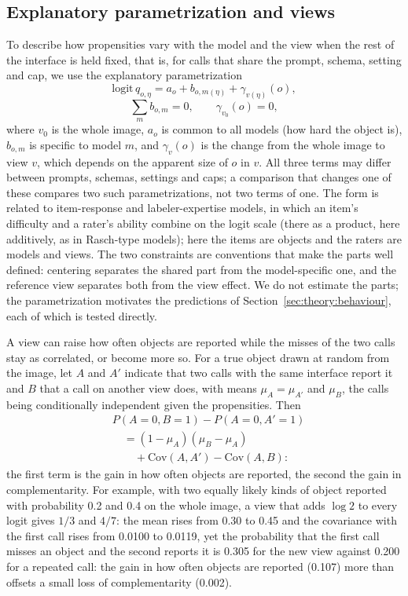 \subsection{Explanatory parametrization and views}\label{app:param}

To describe how propensities vary with the model and the view when the rest of the interface is held fixed, that is, for calls that share the prompt, schema, setting and cap, we use the explanatory parametrization
\[
\mathrm{logit}\,q_{o,\eta}=a_o+b_{o,m(\eta)}+\gamma_{v(\eta)}(o),\]
\[\textstyle\sum_m b_{o,m}=0,\qquad \gamma_{v_0}(o)=0,
\]
where $v_0$ is the whole image, $a_o$ is common to all models (how hard the object is), $b_{o,m}$ is specific to model $m$, and $\gamma_v(o)$ is the change from the whole image to view $v$, which depends on the apparent size of $o$ in $v$. All three terms may differ between prompts, schemas, settings and caps; a comparison that changes one of these compares two such parametrizations, not two terms of one. The form is related to item-response and labeler-expertise models, in which an item's difficulty and a rater's ability combine on the logit scale \citep{whitehill2009glad} (there as a product, here additively, as in Rasch-type models); here the items are objects and the raters are models and views. The two constraints are conventions that make the parts well defined: centering separates the shared part from the model-specific one, and the reference view separates both from the view effect. We do not estimate the parts; the parametrization motivates the predictions of Section~\ref{sec:theory:behaviour}, each of which is tested directly.

A view can raise how often objects are reported while the misses of the two calls stay as correlated, or become more so. For a true object drawn at random from the image, let $A$ and $A'$ indicate that two calls with the same interface report it and $B$ that a call on another view does, with means $\mu_A=\mu_{A'}$ and $\mu_B$, the calls being conditionally independent given the propensities. Then
\[
\begin{aligned}
&P(A=0,B=1)-P(A=0,A'=1)\\
&\quad=(1-\mu_A)(\mu_B-\mu_A)\\
&\qquad+\mathrm{Cov}(A,A')-\mathrm{Cov}(A,B):
\end{aligned}
\]
the first term is the gain in how often objects are reported, the second the gain in complementarity. For example, with two equally likely kinds of object reported with probability 0.2 and 0.4 on the whole image, a view that adds $\log 2$ to every logit gives $1/3$ and $4/7$: the mean rises from 0.30 to 0.45 and the covariance with the first call rises from 0.0100 to 0.0119, yet the probability that the first call misses an object and the second reports it is 0.305 for the new view against 0.200 for a repeated call: the gain in how often objects are reported (0.107) more than offsets a small loss of complementarity (0.002).
